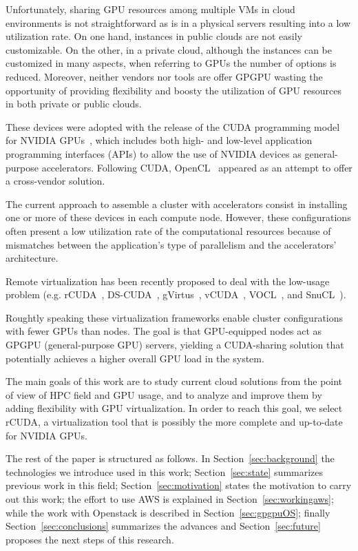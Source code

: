 \documentclass[a4paper,twoside]{article}
\begin{document}
Unfortunately, sharing GPU resources among multiple VMs in cloud environments 
is not straightforward as is in a physical servers resulting into a low utilization rate.
On one hand, instances in public clouds are not easily customizable. 
On the other, in a private cloud, although the instances can be customized in many aspects, when referring to GPUs
the number of options is reduced.
Moreover, neither vendors nor tools are offer GPGPU wasting the opportunity of providing flexibility and boosty the utilization of GPU resources in both private or public clouds.

These devices were adopted with the release of the CUDA programming model for
NVIDIA GPUs~\cite{cuda65}, which includes both high- and low-level application programming interfaces (APIs)
to allow the use of NVIDIA devices as general-purpose
accelerators.
Following CUDA, OpenCL~\cite{opencl} appeared as an attempt
to offer a cross-vendor solution.

The current approach to assemble a cluster with accelerators consist in installing 
one or more of these devices in each compute node.
However, these configurations often present a low
utilization rate of the computational resources
 because of mismatches between the application's type of parallelism
and the accelerators' architecture.

Remote virtualization has been recently proposed to deal with the low-usage problem 
(e.g. {rCUDA}~\cite{tonithesis},
DS-CUDA~\cite{dscuda}, gVirtus~\cite{gvirtus}, vCUDA~\cite{vcuda}, VOCL~\cite{vocl}, and SnuCL~\cite{snucl}).

Roughtly speaking these virtualization frameworks 
enable cluster configurations with fewer GPUs than nodes.  The goal is that 
GPU-equipped nodes act as GPGPU (general-purpose GPU) servers, yielding a CUDA-sharing solution that potentially achieves
a higher overall GPU load in the system.

The main goals of this work are to study current cloud solutions from 
the point of view of HPC field and GPU usage, and to analyze and improve 
them by adding flexibility with GPU virtualization. In order to reach 
this goal, we select rCUDA, a virtualization tool that is possibly the more complete 
and up-to-date for NVIDIA GPUs.

The rest of the paper is structured as follows. 
In Section~\ref{sec:background} the technologies we introduce used in this work;
Section~\ref{sec:state} summarizes previous work in this field; 
Section~\ref{sec:motivation} states the motivation to carry out this work;
the effort to use AWS is explained in Section~\ref{sec:workingaws};
while the work with Openstack is described in Section~\ref{sec:gpgpuOS};
finally Section~\ref{sec:conclusions} summarizes the advances and Section~\ref{sec:future} proposes the next steps
 of this research.
\end{document}
